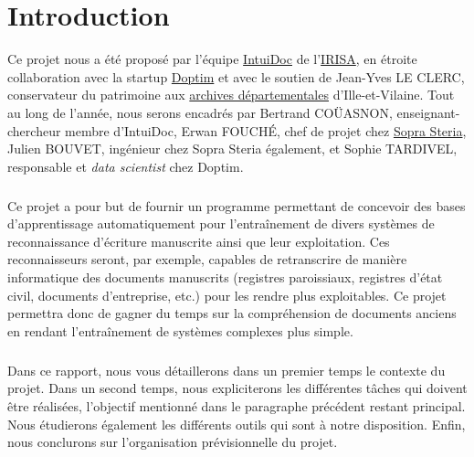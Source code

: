 \chapter{Introduction}
\setcounter{page}{1}

Ce projet nous a été proposé par l’équipe \href{https://www-intuidoc.irisa.fr/}{IntuiDoc}
de l’\href{https://www.irisa.fr/}{IRISA}, en étroite collaboration avec la startup
\href{http://www.doptim.eu}{Doptim} et avec le soutien de Jean-Yves LE CLERC, conservateur du
patrimoine aux \href{http://archives.ille-et-vilaine.fr/fr}{archives départementales} d'Ille-et-Vilaine.
Tout au long de l’année, nous serons encadrés par Bertrand COÜASNON, enseignant-chercheur membre d'IntuiDoc,
Erwan FOUCHÉ, chef de projet chez \href{https://www.soprasteria.com/fr}{Sopra Steria}, Julien BOUVET,
ingénieur chez Sopra Steria également, et Sophie TARDIVEL, responsable et \textit{data scientist}
chez Doptim.

\paragraph{}
Ce projet a pour but de fournir un programme permettant de concevoir des bases d’apprentissage
automatiquement pour l’entraînement de divers systèmes de reconnaissance d’écriture manuscrite
ainsi que leur exploitation. Ces reconnaisseurs seront, par exemple, capables de retranscrire
de manière informatique des documents manuscrits (registres paroissiaux, registres d’état civil,
documents d’entreprise, etc.) pour les rendre plus exploitables. Ce projet permettra donc de gagner
du temps sur la compréhension de documents anciens en rendant l’entraînement de systèmes complexes
plus simple.

\paragraph{}
Dans ce rapport, nous vous détaillerons dans un premier temps le contexte du projet.
Dans un second temps, nous expliciterons les différentes tâches qui doivent être réalisées,
l’objectif mentionné dans le paragraphe précédent restant principal. Nous étudierons également
les différents outils qui sont à notre disposition. Enfin, nous conclurons sur l’organisation
prévisionnelle du projet.